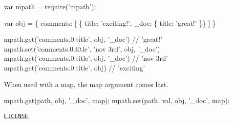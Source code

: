 \begin{DoxyCode}
var mpath = require('mpath');

var obj = \{
    comments: [
      \{ title: 'exciting!', \_doc: \{ title: 'great!' \}\}
    ]
\}

mpath.get('comments.0.title', obj, '\_doc')            // 'great!'
mpath.set('comments.0.title', 'nov 3rd', obj, '\_doc')
mpath.get('comments.0.title', obj, '\_doc')            // 'nov 3rd'
mpath.get('comments.0.title', obj)                    // 'exciting'
\end{DoxyCode}


When used with a {\ttfamily map}, the {\ttfamily map} argument comes last.


\begin{DoxyCode}
mpath.get(path, obj, '\_doc', map);
mpath.set(path, val, obj, '\_doc', map);
\end{DoxyCode}


\href{https://github.com/aheckmann/mpath/blob/master/LICENSE}{\tt L\+I\+C\+E\+N\+SE} 